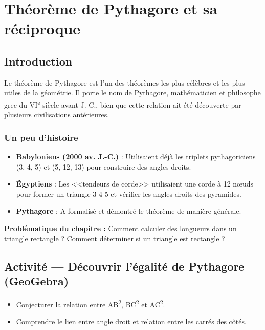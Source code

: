 
\chapter{Théorème de Pythagore et sa réciproque}

\section{Introduction}
Le théorème de Pythagore est l'un des théorèmes les plus célèbres et les plus utiles de la géométrie. Il porte le nom de Pythagore, mathématicien et philosophe grec du VI\textsuperscript{e} siècle avant J.-C., bien que cette relation ait été découverte par plusieurs civilisations antérieures.

\subsection*{Un peu d'histoire}
\begin{itemize}
	\item \textbf{Babyloniens (2000 av. J.-C.)} : Utilisaient déjà les triplets pythagoriciens (3, 4, 5) et (5, 12, 13) pour construire des angles droits.
	\item \textbf{Égyptiens} : Les <<tendeurs de corde>> utilisaient une corde à 12 nœuds pour former un triangle 3-4-5 et vérifier les angles droits des pyramides.
	\item \textbf{Pythagore} : A formalisé et démontré le théorème de manière générale.
\end{itemize}

\textbf{Problématique du chapitre :} Comment calculer des longueurs dans un triangle rectangle ? Comment déterminer si un triangle est rectangle ?

\section{Activité — Découvrir l'égalité de Pythagore (GeoGebra)}

\begin{objectifsbox} 
	\begin{itemize}
		\item[\textbullet] Conjecturer la relation entre AB\textsuperscript{2}, BC\textsuperscript{2} et AC\textsuperscript{2}.
		\item[\textbullet] Comprendre le lien entre angle droit et relation entre les carrés des côtés.
	\end{itemize}
\end{objectifsbox}


